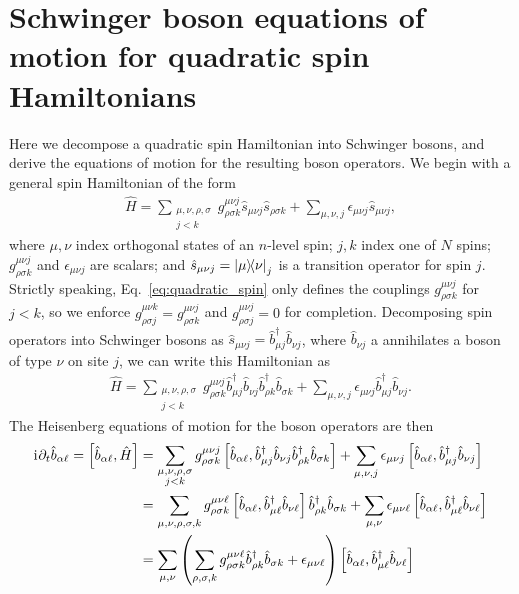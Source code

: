 \documentclass[aps,pra,nofootinbib,twocolumn,superscriptaddress]{revtex4-2}
\newcommand{\p}[1]{\left(#1\right)} %
\renewcommand{\sp}[1]{\left[#1\right]} %
\renewcommand{\i}{\mathrm{i}\mkern1mu} %
\newcommand{\1}{\mathds{1}}
\renewcommand{\b}{\hat b}
\newcommand{\s}{\hat s}
\renewcommand{\H}{\hat H}
\begin{document}
\section{Schwinger boson equations of motion for quadratic spin Hamiltonians}
\label{sec:bosons}

Here we decompose a quadratic spin Hamiltonian into Schwinger bosons, and derive the equations of motion for the resulting boson operators.
We begin with a general spin Hamiltonian of the form
\begin{align}
  \H = \sum_{\substack{\mu,\nu,\rho,\sigma\\j<k}}
  g^{\mu\nu j}_{\rho\sigma k} \s_{\mu\nu j} \s_{\rho\sigma k}
  + \sum_{\mu,\nu,j} \epsilon_{\mu\nu j} \s_{\mu\nu j},
  \label{eq:quadratic_spin}
\end{align}
where $\mu,\nu$ index orthogonal states of an $n$-level spin; $j,k$ index one of $N$ spins; $g^{\mu\nu j}_{\rho\sigma k}$ and $\epsilon_{\mu\nu j}$ are scalars; and $\s_{\mu\nu j}=\op{\mu}{\nu}_j$ is a transition operator for spin $j$.
Strictly speaking, Eq.~\eqref{eq:quadratic_spin} only defines the couplings $g^{\mu\nu j}_{\rho\sigma k}$ for $j<k$, so we enforce $g^{\mu\nu k}_{\rho\sigma j}=g^{\mu\nu j}_{\rho\sigma k}$ and $g^{\mu\nu j}_{\rho\sigma j}=0$ for completion.
Decomposing spin operators into Schwinger bosons as $\s_{\mu\nu j}=\b_{\mu j}^\dag \b_{\nu j}$, where $\b_{\nu j}$ a annihilates a boson of type $\nu$ on site $j$, we can write this Hamiltonian as
\begin{align}
  \H = \sum_{\substack{\mu,\nu,\rho,\sigma\\j<k}}
  g^{\mu\nu j}_{\rho\sigma k}
  \b_{\mu j}^\dag \b_{\nu j} \b_{\rho k}^\dag \b_{\sigma k}
  + \sum_{\mu,\nu,j} \epsilon_{\mu\nu j} \b_{\mu j}^\dag \b_{\nu j}.
\end{align}
The Heisenberg equations of motion for the boson operators are then
\begin{align}
  \i \partial_t \b_{\alpha\ell} = \sp{\b_{\alpha\ell}, \H}
  &= \sum_{\substack{\mu,\nu,\rho,\sigma\\j<k}}
  g^{\mu\nu j}_{\rho\sigma k}
  \sp{\b_{\alpha\ell}, \b_{\mu j}^\dag \b_{\nu j} \b_{\rho k}^\dag \b_{\sigma k}}
  + \sum_{\mu,\nu,j} \epsilon_{\mu\nu j}
  \sp{\b_{\alpha\ell}, \b_{\mu j}^\dag \b_{\nu j}} \\
  &= \sum_{\mu,\nu,\rho,\sigma,k} g^{\mu\nu\ell}_{\rho\sigma k}
  \sp{\b_{\alpha\ell}, \b_{\mu\ell}^\dag \b_{\nu\ell}}
  \b_{\rho k}^\dag \b_{\sigma k}
  + \sum_{\mu,\nu} \epsilon_{\mu\nu\ell}
  \sp{\b_{\alpha\ell}, \b_{\mu\ell}^\dag \b_{\nu\ell}} \\
  &= \sum_{\mu,\nu} \p{\sum_{\rho,\sigma,k}
    g^{\mu\nu\ell}_{\rho\sigma k} \b_{\rho k}^\dag \b_{\sigma k}
    + \epsilon_{\mu\nu\ell}}
  \sp{\b_{\alpha\ell}, \b_{\mu\ell}^\dag \b_{\nu\ell}}
\end{align}
\end{document}
